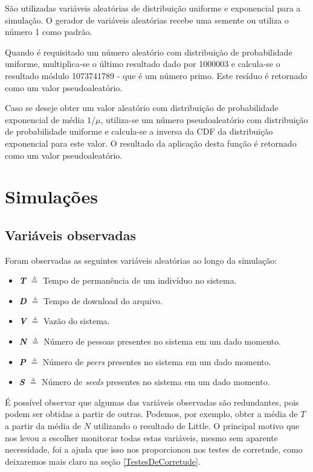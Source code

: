 \documentclass[a4paper,10pt]{article}
\begin{document}
São utilizadas variáveis aleatórias de distribuição uniforme e exponencial para a simulação. O gerador de variáveis aleatórias recebe uma semente ou utiliza o número 1 como padrão.

Quando é requisitado um número aleatório com distribuição de probabilidade uniforme, multiplica-se o último resultado dado por 1000003 e calcula-se o resultado módulo 1073741789 - que é um número primo. Este resíduo é retornado como um valor pseudoaleatório.

Caso se deseje obter um valor aleatório com distribuição de probabilidade exponencial de média $1 / \mu$, utiliza-se um número pseudoaleatório com distribuição de probabilidade uniforme e calcula-se a inversa da CDF da distribuição exponencial para este valor. O resultado da aplicação desta função é retornado como um valor pseudoaleatório.

\pagebreak

\section{Simulações}

\subsection{Variáveis observadas}

Foram observadas as seguintes variáveis aleatórias ao longo da simulação:
\begin{itemize}
	\item \textbf{\textit{T}} $\overset{\underset{\mathrm{\Delta}}{}}{=}$ Tempo de permanência de um indivíduo no sistema.
	\item \textbf{\textit{D}} $\overset{\underset{\mathrm{\Delta}}{}}{=}$ Tempo de download do arquivo.
	\item \textbf{\textit{V}} $\overset{\underset{\mathrm{\Delta}}{}}{=}$ Vazão do sistema.
	\item \textbf{\textit{N}} $\overset{\underset{\mathrm{\Delta}}{}}{=}$ Número de pessoas presentes no sistema em um dado momento.
	\item \textbf{\textit{P}} $\overset{\underset{\mathrm{\Delta}}{}}{=}$ Número de \textit{peers} presentes no sistema em um dado momento.
	\item \textbf{\textit{S}} $\overset{\underset{\mathrm{\Delta}}{}}{=}$ Número de \textit{seeds} presentes no sistema em um dado momento.
\end{itemize}

É possível observar que algumas das variáveis observadas são redundantes, pois podem ser obtidas a partir de outras. Podemos, por exemplo, obter a média de $T$ a partir da média de $N$ utilizando o resultado de Little. O principal motivo que nos levou a escolher monitorar todas estas variáveis, mesmo sem aparente necessidade, foi a ajuda que isso nos proporcionou nos testes de corretude, como deixaremos mais claro na seção \ref{TestesDeCorretude}.
\end{document}
